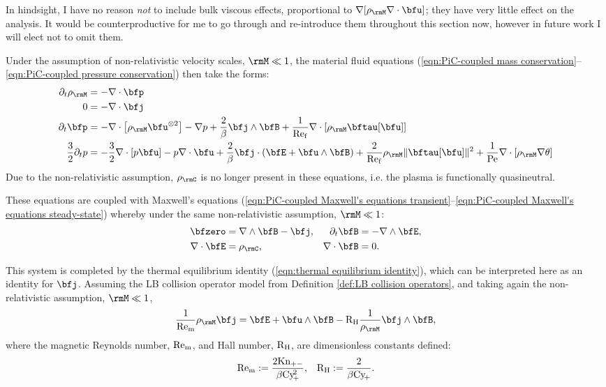     \begin{remark}
        In hindsight, I have no reason \emph{not} to include bulk viscous effects, proportional to $\nabla[\rho_{\rmM}\nabla\cdot\bfu]$; they have very little effect on the analysis. It would be counterproductive for me to go through and re-introduce them throughout this section now, however in future work I will elect not to omit them.
    \end{remark}

    Under the assumption of non-relativistic velocity scales, $\rmM  \ll  1$, the material fluid equations (\ref{eqn:PiC-coupled mass conservation}--\ref{eqn:PiC-coupled pressure conservation}) then take the forms:
    \begin{align}
         \partial_{t}\rho_{\rmM}  &=  - \nabla\cdot\bfp  \\
                               0  &=  - \nabla\cdot\bfj  \\
                \partial_{t}\bfp  &=  - \nabla\cdot\left[\rho_{\rmM}\bfu^{\otimes 2}\right] - \nabla p + \frac{2}{\beta}\bfj\wedge\bfB + \frac{1}{\rmRef}\nabla\cdot[\rho_{\rmM}\bftau[\bfu]]  \\
        \frac{3}{2}\partial_{t}p  &=  - \frac{3}{2}\nabla\cdot[p\bfu] - p\nabla\cdot\bfu + \frac{2}{\beta}\bfj\cdot(\bfE + \bfu\wedge\bfB) + \frac{2}{\rmRef}\rho_{\rmM}\|\bftau[\bfu]\|^{2} + \frac{1}{\rmPe}\nabla\cdot[\rho_{\rmM}\nabla\theta]
    \end{align}
    Due to the non-relativistic assumption, $\rho_{\rmC}$ is no longer present in these equations, i.e. the plasma is functionally quasineutral.

    These equations are coupled with Maxwell's equations (\ref{eqn:PiC-coupled Maxwell's equations transient}--\ref{eqn:PiC-coupled Maxwell's equations steady-state}) whereby under the same non-relativistic assumption, $\rmM  \ll  1$:
    \begin{align}
                 \bfzero  &=  \nabla\wedge\bfB - \bfj,  &
        \partial_{t}\bfB  &=  - \nabla\wedge\bfE,  \\
         \nabla\cdot\bfE  &=  \rho_{\rmC},  &
         \nabla\cdot\bfB  &=  0.
    \end{align}
    
    This system is completed by the thermal equilibrium identity (\ref{eqn:thermal equilibrium identity}), which can be interpreted here as an identity for $\bfj$. Assuming the LB collision operator model from Definition \ref{def:LB collision operators}, and taking again the non-relativistic assumption, $\rmM  \ll  1$,
    \begin{equation}
        \frac{1}{\rmRem}\rho_{\rmM}\bfj  =  \bfE + \bfu\wedge\bfB - \rmRH\frac{1}{\rho_{\rmM}}\bfj\wedge\bfB,
    \end{equation}
    where the magnetic Reynolds number, $\mathrm{Re}_{\mathrm{m}}$, and Hall number, $\mathrm{R}_{\mathrm{H}}$, are dimensionless constants defined:
    \begin{align}
        \mathrm{Re}_{\mathrm{m}}  :=  \frac{2\mathrm{Kn}_{+-}}{\beta\mathrm{Cy}\!_{+}^{2}},  &&
        \mathrm{R}_{\mathrm{H}}   :=  \frac{2}{\beta\mathrm{Cy}\!_{+}}.
    \end{align}

